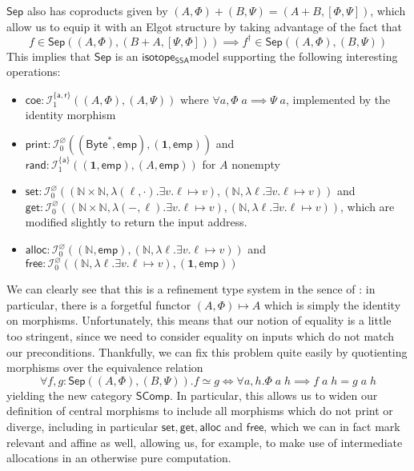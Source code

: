 \documentclass[acmsmall,screen,review]{acmart}
\newcommand{\mc}[1]{\ensuremath{\mathcal{#1}}}
\newcommand{\mb}[1]{\ensuremath{\mathbf{#1}}}
\newcommand{\ms}[1]{\ensuremath{\mathsf{#1}}}
\newcommand{\nats}{\mathbb{N}}
\newcommand{\taff}{{\{\ms{a}\}}}
\newcommand{\tint}{{\{\ms{a}, \ms{r}\}}}
\newcommand{\isotopessa}{\ms{isotope_{SSA}}}
\begin{document}
\(\ms{Sep}\) also has coproducts given by \((A, \Phi) + (B, \Psi) = (A + B, [\Phi, \Psi])\), which allow us to equip it with an Elgot structure by taking advantage of the fact that
\begin{equation}
  f \in \ms{Sep}((A, \Phi), (B + A, [\Psi, \Phi])) \implies f^\dagger \in \ms{Sep}((A, \Phi), (B, \Psi))
\end{equation}
This implies that \(\ms{Sep}\) is an \isotopessa model supporting the following
interesting operations:
\begin{itemize}
  \item \(\ms{coe}: \mc{I}^\tint_1((A, \Phi), (A, \Psi))\) where \(\forall a,
  \Phi\;a \implies \Psi\;a\), implemented by the identity morphism
  \item \(\ms{print}: \mc{I}^\varnothing_0((\ms{Byte}^*, \ms{emp}), (\mb{1},
  \ms{emp}))\) and \(\ms{rand}: \mc{I}^\taff_1((\mb{1}, \ms{emp}), (A, \ms{emp}))\) for
  \(A\) nonempty
  \item \(\ms{set}: \mc{I}^\varnothing_0((\nats \times \nats, \lambda (\ell,
  \cdot). \exists v. \ell \mapsto v), (\nats, \lambda \ell. \exists v. \ell
  \mapsto v))\) and \(\ms{get}: \mc{I}^\varnothing_0((\nats \times \nats,
  \lambda (-, \ell). \exists v. \ell \mapsto v), (\nats, \lambda \ell. \exists
  v. \ell \mapsto v))\), which are modified slightly to return the input address.
  \item \(\ms{alloc}: \mc{I}^\varnothing_0((\nats, \ms{emp}), (\nats, \lambda
  \ell. \exists v. \ell \mapsto v))\) and \(\ms{free}: \mc{I}^\varnothing_0((\nats, \lambda \ell. \exists v. \ell \mapsto v), (\mb{1}, \ms{emp}))\)
\end{itemize}
We can clearly see that this is a refinement type system in the sence of
\cite{mellies-ftrs}: in particular, there is a forgetful functor \((A, \Phi)
\mapsto A\) which is simply the identity on morphisms. Unfortunately, this means
that our notion of equality is a little too stringent, since we need to consider
equality on inputs which do not match our preconditions. Thankfully, we can fix
this problem quite easily by quotienting morphisms over the equivalence relation
\begin{equation}
  \forall f, g: \ms{Sep}((A, \Phi), (B, \Psi)).
  f \simeq g \iff \forall a, h. \Phi\;a\;h \implies f\;a\;h = g\;a\;h
\end{equation}
yielding the new category \(\ms{SComp}\). In particular, this allows us to widen
our definition of central morphisms to include all morphisms which do not print
or diverge, including in particular \(\ms{set}, \ms{get}, \ms{alloc}\) and
\(\ms{free}\), which we can in fact mark relevant and affine as well, allowing
us, for example, to make use of intermediate allocations in an otherwise pure
computation.
\end{document}
